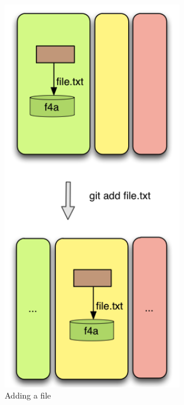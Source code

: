 \begin{figure}[tp]
   \begin{minipage}[b]{0.5\linewidth}
      \centering
      \includegraphics[width=0.7\textwidth]{images/add1.png}
      \caption{Adding a file}\label{fig:add1}
   \end{minipage}
   \begin{minipage}[b]{0.5\linewidth}
      \centering 

\end{minipage}
\end{figure}
